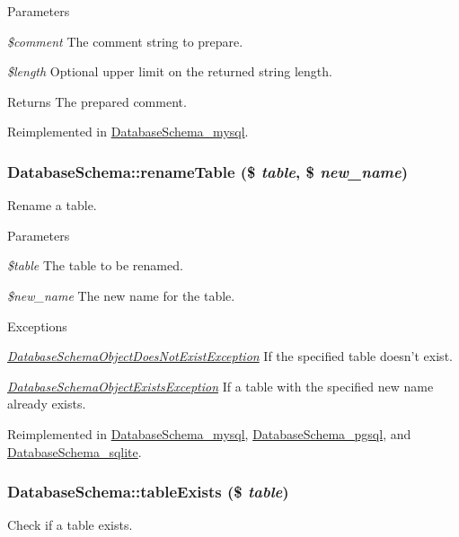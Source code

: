 \begin{DoxyParams}{Parameters}
\item[{\em \$comment}]The comment string to prepare. \item[{\em \$length}]Optional upper limit on the returned string length.\end{DoxyParams}
\begin{DoxyReturn}{Returns}
The prepared comment. 
\end{DoxyReturn}


Reimplemented in \hyperlink{classDatabaseSchema__mysql_a3769228a1a4831bc1dd75d9d4c5802dc}{DatabaseSchema\_\-mysql}.\hypertarget{classDatabaseSchema_aaa0b6f32797505bdfc9ed953e10a486e}{
\subsubsection[{renameTable}]{\setlength{\rightskip}{0pt plus 5cm}DatabaseSchema::renameTable (\$ {\em table}, \/  \$ {\em new\_\-name})}}
\label{classDatabaseSchema_aaa0b6f32797505bdfc9ed953e10a486e}
Rename a table.


\begin{DoxyParams}{Parameters}
\item[{\em \$table}]The table to be renamed. \item[{\em \$new\_\-name}]The new name for the table.\end{DoxyParams}

\begin{DoxyExceptions}{Exceptions}
\item[{\em \hyperlink{classDatabaseSchemaObjectDoesNotExistException}{DatabaseSchemaObjectDoesNotExistException}}]If the specified table doesn't exist. \item[{\em \hyperlink{classDatabaseSchemaObjectExistsException}{DatabaseSchemaObjectExistsException}}]If a table with the specified new name already exists. \end{DoxyExceptions}


Reimplemented in \hyperlink{classDatabaseSchema__mysql_acd72dda186ab4889a8d5ae2f51b92dba}{DatabaseSchema\_\-mysql}, \hyperlink{classDatabaseSchema__pgsql_a899f676d802888ded3f6d4a171794f53}{DatabaseSchema\_\-pgsql}, and \hyperlink{classDatabaseSchema__sqlite_a3ca3d490665805d43e6c143b90de0cf9}{DatabaseSchema\_\-sqlite}.\hypertarget{classDatabaseSchema_acf4650f58bed6fc76d94d49a72e5d706}{
\subsubsection[{tableExists}]{\setlength{\rightskip}{0pt plus 5cm}DatabaseSchema::tableExists (\$ {\em table})}}
\label{classDatabaseSchema_acf4650f58bed6fc76d94d49a72e5d706}
Check if a table exists.


